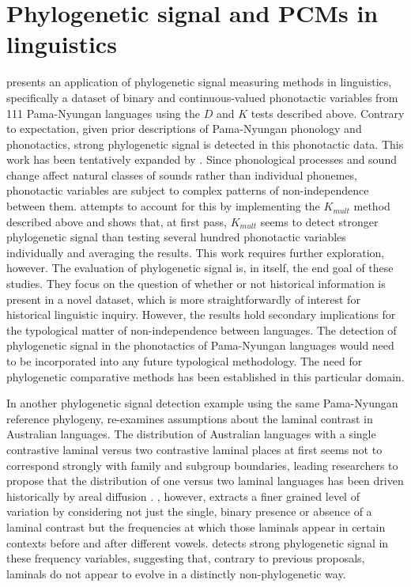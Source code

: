 \hypertarget{pcms-applications}{%
\section{Phylogenetic signal and PCMs in linguistics}\label{pcms-applications}}

\textcite{macklin-cordes_phylogenetic_2021} presents an application of phylogenetic signal measuring methods in linguistics, specifically a dataset of binary and continuous-valued phonotactic variables from 111 Pama-Nyungan languages using the \(D\) and \(K\) tests described above. Contrary to expectation, given prior descriptions of Pama-Nyungan phonology and phonotactics, strong phylogenetic signal is detected in this phonotactic data. This work has been tentatively expanded by \textcite{macklin-cordes_phylogeny_2018}. Since phonological processes and sound change affect natural classes of sounds rather than individual phonemes, phonotactic variables are subject to complex patterns of non-independence between them. \textcite{macklin-cordes_phylogeny_2018} attempts to account for this by implementing the \(K_{mult}\) method described above and shows that, at first pass, \(K_{mult}\) seems to detect stronger phylogenetic signal than testing several hundred phonotactic variables individually and averaging the results. This work requires further exploration, however. The evaluation of phylogenetic signal is, in itself, the end goal of these studies. They focus on the question of whether or not historical information is present in a novel dataset, which is more straightforwardly of interest for historical linguistic inquiry. However, the results hold secondary implications for the typological matter of non-independence between languages. The detection of phylogenetic signal in the phonotactics of Pama-Nyungan languages would need to be incorporated into any future typological methodology. The need for phylogenetic comparative methods has been established in this particular domain.

In another phylogenetic signal detection example using the same Pama-Nyungan reference phylogeny, \textcite{round_continent-wide_2017} re-examines assumptions about the laminal contrast in Australian languages. The distribution of Australian languages with a single contrastive laminal versus two contrastive laminal places at first seems not to correspond strongly with family and subgroup boundaries, leading researchers to propose that the distribution of one versus two laminal languages has been driven historically by areal diffusion \autocites{dixon_languages_1970}{dixon_languages_1980}{breen_taps_1997}{dixon_australian_2002}. \textcite{round_continent-wide_2017}, however, extracts a finer grained level of variation by considering not just the single, binary presence or absence of a laminal contrast but the frequencies at which those laminals appear in certain contexts before and after different vowels. \textcite{round_continent-wide_2017} detects strong phylogenetic signal in these frequency variables, suggesting that, contrary to previous proposals, laminals do not appear to evolve in a distinctly non-phylogenetic way.

